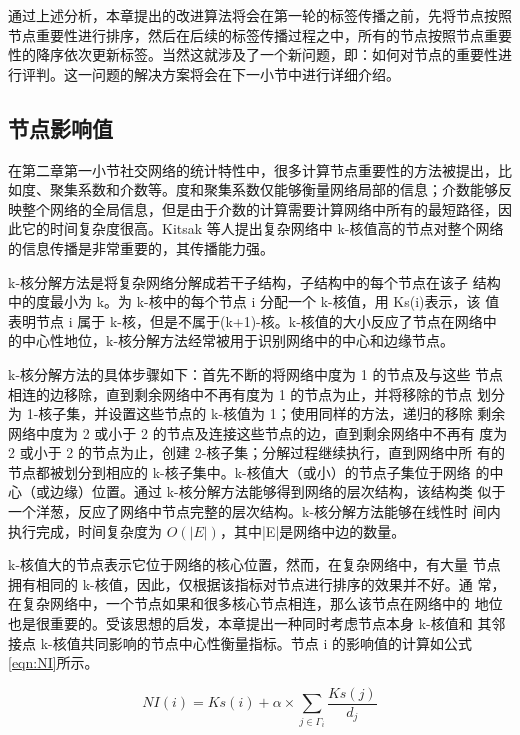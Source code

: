 通过上述分析，本章提出的改进算法将会在第一轮的标签传播之前，先将节点按照节点重要性进行排序，然后在后续的标签传播过程之中，所有的节点按照节点重要性的降序依次更新标签。当然这就涉及了一个新问题，即：如何对节点的重要性进行评判。这一问题的解决方案将会在下一小节中进行详细介绍。



\subsection{节点影响值}
在第二章第一小节社交网络的统计特性中，很多计算节点重要性的方法被提出，比如度、聚集系数和介数等。度和聚集系数仅能够衡量网络局部的信息；介数能够反映整个网络的全局信息，但是由于介数的计算需要计算网络中所有的最短路径，因此它的时间复杂度很高。Kitsak 等人\cite{Kitsak2010Identification}提出复杂网络中 k-核值高的节点对整个网络的信息传播是非常重要的，其传播能力强。

k-核分解方法是将复杂网络分解成若干子结构，子结构中的每个节点在该子
结构中的度最小为 k。为 k-核中的每个节点 i 分配一个 k-核值，用 Ks(i)表示，该
值表明节点 i 属于 k-核，但是不属于(k+1)-核。k-核值的大小反应了节点在网络中
的中心性地位，k-核分解方法经常被用于识别网络中的中心和边缘节点。

k-核分解方法的具体步骤如下：首先不断的将网络中度为 1 的节点及与这些
节点相连的边移除，直到剩余网络中不再有度为 1 的节点为止，并将移除的节点
划分为 1-核子集，并设置这些节点的 k-核值为 1；使用同样的方法，递归的移除
剩余网络中度为 2 或小于 2 的节点及连接这些节点的边，直到剩余网络中不再有
度为 2 或小于 2 的节点为止，创建 2-核子集；分解过程继续执行，直到网络中所
有的节点都被划分到相应的 k-核子集中。k-核值大（或小）的节点子集位于网络
的中心（或边缘）位置。通过 k-核分解方法能够得到网络的层次结构，该结构类
似于一个洋葱，反应了网络中节点完整的层次结构。k-核分解方法能够在线性时
间内执行完成，时间复杂度为 $O(|E|)$，其中|E|是网络中边的数量。

k-核值大的节点表示它位于网络的核心位置，然而，在复杂网络中，有大量
节点拥有相同的 k-核值，因此，仅根据该指标对节点进行排序的效果并不好。通
常，在复杂网络中，一个节点如果和很多核心节点相连，那么该节点在网络中的
地位也是很重要的。受该思想的启发，本章提出一种同时考虑节点本身 k-核值和
其邻接点 k-核值共同影响的节点中心性衡量指标。节点 i 的影响值的计算如公式\ref{eqn:NI}所示。

\begin{equation}
  \label{eqn:NI}
  NI(i)=Ks(i)+\alpha \times \sum_{j \in \Gamma _i} \frac{Ks(j)}{d_j}
\end{equation}

